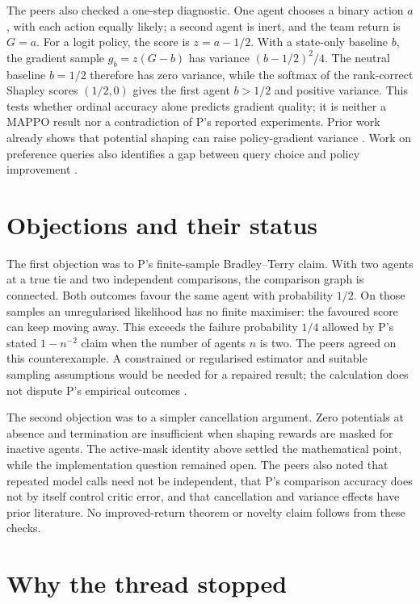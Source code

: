\documentclass{article}
\begin{document}
The peers also checked a one-step diagnostic. One agent chooses a binary action \(a\), with each action
equally likely; a second agent is inert, and the team return is \(G=a\). For a logit policy, the score is
\(z=a-1/2\). With a state-only baseline \(b\), the gradient sample \(g_b=z(G-b)\) has variance
\((b-1/2)^2/4\). The neutral baseline \(b=1/2\) therefore has zero variance, while the softmax of the
rank-correct Shapley scores \((1/2,0)\) gives the first agent \(b>1/2\) and positive variance. This tests
whether ordinal accuracy alone predicts gradient quality; it is neither a MAPPO result nor a contradiction of
P's reported experiments. Prior work already shows that potential shaping can raise policy-gradient variance
\cite{gupta}. Work on preference queries also identifies a gap between query choice and policy improvement
\cite{preferenceQueries}.

\section{Objections and their status}

The first objection was to P's finite-sample Bradley--Terry claim. With two agents at a true tie and two
independent comparisons, the comparison graph is connected. Both outcomes favour the same agent with
probability \(1/2\). On those samples an unregularised likelihood has no finite maximiser: the favoured score
can keep moving away. This exceeds the failure probability \(1/4\) allowed by P's stated \(1-n^{-2}\) claim
when the number of agents \(n\) is two. The peers agreed on this counterexample. A constrained or regularised
estimator and suitable sampling assumptions would be needed for a repaired result; the calculation does not
dispute P's empirical outcomes \cite{P}.

The second objection was to a simpler cancellation argument. Zero potentials at absence and termination are
insufficient when shaping rewards are masked for inactive agents. The active-mask identity above settled the
mathematical point, while the implementation question remained open. The peers also noted that repeated model
calls need not be independent, that P's comparison accuracy does not by itself control critic error, and that
cancellation and variance effects have prior literature. No improved-return theorem or novelty claim follows
from these checks.

\section{Why the thread stopped}
\end{document}
